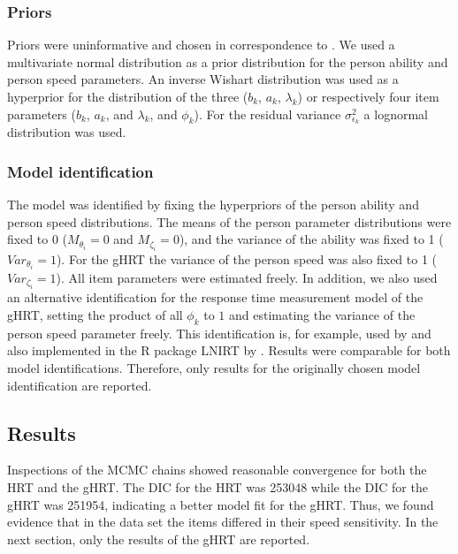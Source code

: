 \documentclass[a4paper,man,apacite,floatsintext,donotrepeattitle]{apa6}
\begin{document}
\subsubsection{Priors}
Priors were uninformative and chosen in correspondence to . We used a multivariate normal distribution as a prior distribution for the person ability and person speed parameters. An inverse Wishart distribution was used as a hyperprior for the distribution of the three ($b_{k}$, $a_{k}$, $\lambda_{k}$) or respectively four item parameters ($b_{k}$, $a_{k}$, and $\lambda_{k}$, and $\phi_{k}$). For the residual variance $\sigma^2_{\epsilon_{k}}$ a lognormal distribution was used. 

\subsubsection{Model identification}   
The model was identified by fixing the hyperpriors of the person ability and person speed distributions. The means of the person parameter distributions were fixed to 0 ($M_{\theta_{i}} = 0$ and $M_{\zeta_{i}} = 0$), and the variance of the ability was fixed to 1 ($Var_{\theta_{i}} = 1$). For the gHRT the variance of the person speed was also fixed to 1 ($Var_{\zeta_{i}} = 1$). All item parameters were estimated freely. In addition, we also used an alternative identification for the response time measurement model of the gHRT, setting the product of all $\phi_{k}$ to $1$ and estimating the variance of the person speed parameter freely. This identification is, for example, used by  and also implemented in the R package LNIRT by . Results were comparable for both model identifications. Therefore, only results for the originally chosen model identification are reported.


\subsection{Results} 
Inspections of the MCMC chains showed reasonable convergence for both the HRT and the gHRT. The DIC for the HRT was 253048 while the DIC for the gHRT was 251954, indicating a better model fit for the gHRT. Thus, we found evidence that in the data set the items differed in their speed sensitivity. In the next section, only the results of the gHRT are reported. 
\end{document}
